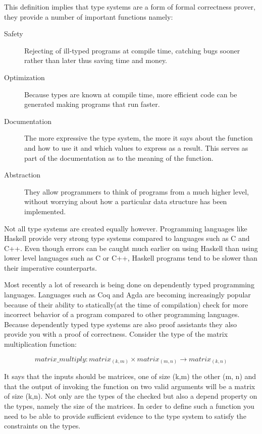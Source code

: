 \documentclass[11pt,twoside,a4paper]{article}
\begin{document}
This definition implies that type systems are a form of formal correctness prover, they provide a number of important functions namely:

\begin{description}
\item[Safety] Rejecting of ill-typed programs at compile time, catching bugs sooner rather than later thus saving time and money.
\item[Optimization] Because types are known at compile time, more efficient code can be generated making programs that run faster.
\item[Documentation] The more expressive the type system, the more it says about the function and how to use it and which values to express as a result. This serves as part of the documentation as to the meaning of the function.
\item[Abstraction] They allow programmers to think of programs from a much higher level, without worrying about how a particular data structure has been implemented.
\end{description}

Not all type systems are created equally however. Programming languages like Haskell\cite{Haskell} provide very strong type systems compared to languages such as C and C++. Even though errors can be caught much earlier on using Haskell than using lower level languages such as C or C++, Haskell programs tend to be slower than their imperative counterparts\cite{benchmark}.

Most recently a lot of research is being done on dependently typed programming languages. Languages such as Coq\cite{Coq} and Agda\cite{Agda} are becoming increasingly popular because of their ability to statically(at the time of compilation) check for more incorrect behavior of a program compared to other programming languages. Because dependently typed type systems are also proof assistants they also provide you with a proof of correctness. Consider the type of the matrix multiplication function: 

\begin{equation}
matrix\_multiply : matrix_{(k,m)} \times matrix_{(m,n)} \rightarrow matrix_{(k,n)}
\end{equation}

It says that the inputs should be matrices, one of size (k,m) the other (m, n) and that the output of invoking the function on two valid arguments will be a matrix of size (k,n).  Not only are the types of the checked but also a depend property on the types, namely the size of the matrices. In order to define such a function you need to be able to provide sufficient evidence to the type system to satisfy the constraints on the types. 
\end{document}
